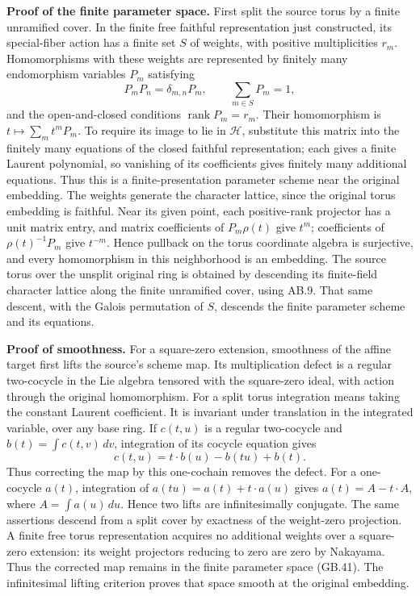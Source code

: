 \documentclass[
  11pt,
]{article}
\begin{document}
\textbf{Proof of the finite parameter space.} First split the source
torus by a finite unramified cover. In the finite free faithful
representation just constructed, its special-fiber action has a finite
set \(S\) of weights, with positive multiplicities \(r_m\).
Homomorphisms with these weights are represented by finitely many
endomorphism variables \(P_m\) satisfying \[
 P_mP_n=\delta_{m,n}P_m,\qquad \sum_{m\in S}P_m=1,
 \tag{GB.41}
\] and the open-and-closed conditions \(\operatorname {rank}P_m=r_m\).
Their homomorphism is \(t\mapsto\sum_m t^mP_m\). To require its image to
lie in \(\mathcal H\), substitute this matrix into the finitely many
equations of the closed faithful representation; each gives a finite
Laurent polynomial, so vanishing of its coefficients gives finitely many
additional equations. Thus this is a finite-presentation parameter
scheme near the original embedding. The weights generate the character
lattice, since the original torus embedding is faithful. Near its given
point, each positive-rank projector has a unit matrix entry, and matrix
coefficients of \(P_m\rho(t)\) give \(t^m\); coefficients of
\(\rho(t)^{-1}P_m\) give \(t^{-m}\). Hence pullback on the torus
coordinate algebra is surjective, and every homomorphism in this
neighborhood is an embedding. The source torus over the unsplit original
ring is obtained by descending its finite-field character lattice along
the finite unramified cover, using AB.9. That same descent, with the
Galois permutation of \(S\), descends the finite parameter scheme and
its equations.

\textbf{Proof of smoothness.} For a square-zero extension, smoothness of
the affine target first lifts the source's scheme map. Its
multiplication defect is a regular two-cocycle in the Lie algebra
tensored with the square-zero ideal, with action through the original
homomorphism. For a split torus integration means taking the constant
Laurent coefficient. It is invariant under translation in the integrated
variable, over any base ring. If \(c(t,u)\) is a regular two-cocycle and
\(b(t)=\int c(t,v)\,dv\), integration of its cocycle equation gives \[
 c(t,u)=t\cdot b(u)-b(tu)+b(t).
 \tag{GB.42}
\] Thus correcting the map by this one-cochain removes the defect. For a
one-cocycle \(a(t)\), integration of \(a(tu)=a(t)+t\cdot a(u)\) gives
\(a(t)=A-t\cdot A\), where \(A=\int a(u)\,du\). Hence two lifts are
infinitesimally conjugate. The same assertions descend from a split
cover by exactness of the weight-zero projection. A finite free torus
representation acquires no additional weights over a square-zero
extension: its weight projectors reducing to zero are zero by Nakayama.
Thus the corrected map remains in the finite parameter space (GB.41).
The infinitesimal lifting criterion proves that space smooth at the
original embedding.
\end{document}
